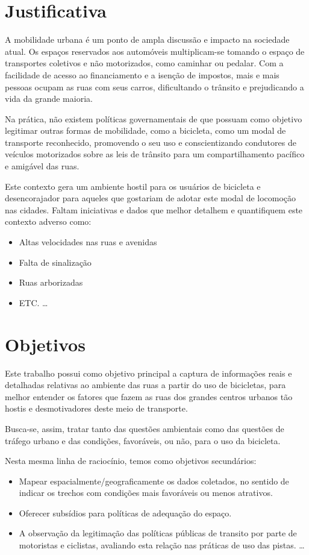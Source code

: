 \documentclass[final,12pt, times, 5p, twocolumn]{elsarticle}
\begin{document}
\section{Justificativa}
A mobilidade urbana é um ponto de ampla discussão e impacto na sociedade atual. Os espaços reservados aos automóveis multiplicam-se tomando o espaço de transportes coletivos e não motorizados, como caminhar ou pedalar. Com a facilidade de acesso ao financiamento e a isenção de impostos, mais e mais pessoas ocupam as ruas com seus carros,  dificultando o trânsito  e prejudicando a vida da grande maioria.

Na prática, não existem políticas governamentais de que possuam como objetivo legitimar outras formas de mobilidade, como a bicicleta, como um modal de transporte reconhecido, promovendo o seu uso e conscientizando condutores de veículos motorizados sobre as leis de trânsito para um compartilhamento pacífico e amigável das ruas. 

Este contexto gera um ambiente hostil para os usuários de bicicleta e desencorajador para aqueles que gostariam de adotar este modal de locomoção nas cidades. Faltam iniciativas e dados que melhor detalhem e quantifiquem este contexto adverso como:
\begin{itemize}

  \item Altas velocidades nas ruas e avenidas
  \item Falta de sinalização
  \item Ruas arborizadas
  \item ETC. \ldots

\end{itemize}

\section{Objetivos}
Este trabalho possui como objetivo principal a captura de informações reais e detalhadas relativas ao ambiente das ruas a partir do uso de bicicletas, para melhor entender os fatores que fazem as ruas dos grandes centros urbanos tão hostis e desmotivadores deste meio de transporte. 

Busca-se, assim, tratar tanto das questões ambientais como das questões de tráfego urbano e das condições, favoráveis, ou não, para o uso da bicicleta.

Nesta mesma linha de raciocínio, temos como objetivos secundários:

\begin{itemize}

  \item Mapear espacialmente/geograficamente os dados coletados, no sentido de indicar os trechos com condições mais favoráveis ou menos atrativos.
  \item Oferecer subsídios para políticas de adequação do espaço.
  \item A observação da legitimação das políticas públicas de transito por parte de motoristas e ciclistas, avaliando esta relação nas práticas de uso das pistas. \ldots

\end{itemize}
\end{document}

